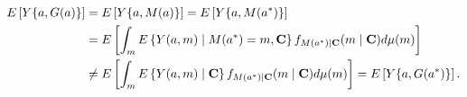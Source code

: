 \documentclass[12pt]{article}
\begin{document}
\begin{comment}
\begin{align*}
        E\left[Y\{a,G(a)\}\right]
        &= E\left[Y\{a,M(a)\}\right]\\
        &= E\left[Y\{a,M(a^*)\}\right]\\
        &= E\left(E\left[Y\{a,M(a^*)\}\mid M(a^*), {\bf C}\right]\right)\\
        &= E\left[\int_m E\left\{Y(a,m)\mid M(a^*)=m, {\bf C}\right\}f_{M(a^*)\mid {\bf C}}(m\mid {\bf C})d\mu(m)\right]\\
        &\neq E\left[\int_m E\left\{Y(a,m)\mid {\bf C}\right\}f_{M(a^*)\mid {\bf C}}(m\mid {\bf C})d\mu(m)\right]\\
        &= E\left[Y\{a,G(a^*)\}\right]
\end{align*}
\end{comment}
\begin{align*}
    E\left[Y\{a,G(a)\}\right]
    &= E\left[Y\{a,M(a)\}\right] = E\left[Y\{a,M(a^*)\}\right]\\
    &= E\left[\int_m E\left\{Y(a,m)\mid M(a^*)=m, {\bf C}\right\}f_{M(a^*)\mid {\bf C}}(m\mid {\bf C})d\mu(m)\right]\\
    &\neq E\left[\int_m E\left\{Y(a,m)\mid {\bf C}\right\}f_{M(a^*)\mid {\bf C}}(m\mid {\bf C})d\mu(m)\right] = E\left[Y\{a,G(a^*)\}\right].
\end{align*}
\end{document}
